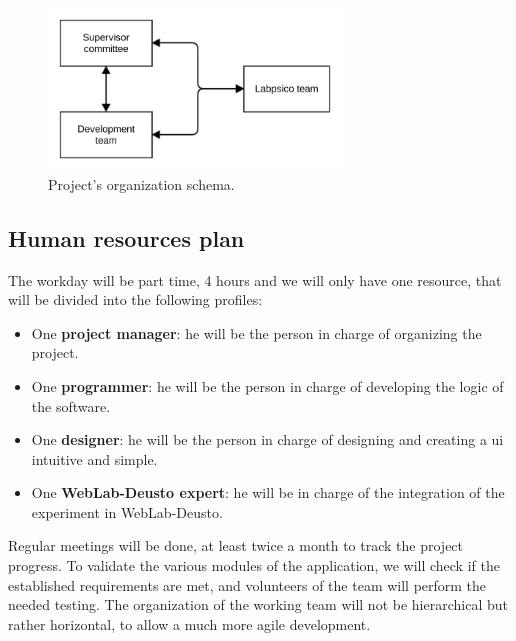 \begin{figure}[ht]
	\centering
	\includegraphics[width=0.7\textwidth]{fig/organization}
	\caption{Project's organization schema.}\label{fig:org}
\end{figure}

\subsection{Human resources plan}

The workday will be part time, 4 hours and we will only have one resource, that will be divided into
the following profiles:

\begin{itemize}
\item One \textbf{project manager}: he will be the person in charge of organizing the project.

\item One \textbf{programmer}: he will be the person in charge of developing the logic of the
software.

\item One \textbf{designer}: he will be the person in charge of designing and creating a
\acrlong{ui} intuitive and simple.

\item One \textbf{WebLab-Deusto expert}: he will be in charge of the integration of the experiment
in WebLab-Deusto.
\end{itemize}

Regular meetings will be done, at least twice a month to track the project progress. To validate the
various modules of the application, we will check if the established requirements are met, and
volunteers of the team will perform the needed testing. The organization of the working team will
not be hierarchical but rather horizontal, to allow a much more agile development.
